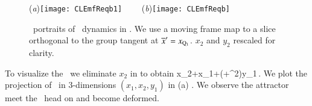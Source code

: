 %
\begin{figure}[ht]
\begin{center}
  (\textit{a})\texttt{[image: CLEmfReqb1]}
~~~~(\textit{b})\texttt{[image: CLEmfReqb]}
\end{center}
\caption{
\Statesp\ portraits of \cLe\ dynamics in \reducedsp. We use a
moving frame map to a slice orthogonal to the group tangent
at  ${\overline{x}'}  = x_{\mathrm{Q}_{1}}$. $x_2$ and $y_2$ rescaled
for clarity.
    }
\label{fig:CLEmfReqb1}
\end{figure}
%

To visualize the \sset\ we eliminate $x_2$ in  to obtain
\beq
	x_2+x_1+\left(+^2\right)y_1\,.
We plot the projection of \sset\ in $3$-dimensions $(x_1,x_2,y_1)$ in (a)
.
We observe the attractor meet the \sset\ head on and become deformed. 

